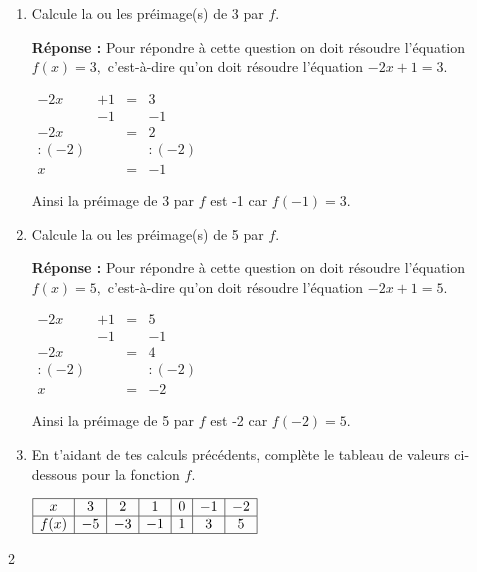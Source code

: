 \documentclass[a4paper,11pt]{report}
\begin{document}
{\begin{enumerate}
{\bf Réponse :} Pour répondre à cette question on doit résoudre l'équation $f(x)=1,$ c'est-à-dire qu'on doit résoudre l'équation $-2x+1=1.$
\begin{center}
$\begin{array}{cccc}
-2x&+1&=&1\\
&-1& & -1 \\\hline
-2x & & =& 0 \\
:(-2) & & & :(-2) \\\hline
x & & = &  0
\end{array}$
\end{center}
Ainsi la préimage de 1 par $f$ est 0 car $f(0)= 1.$
\item Calcule la ou les préimage(s) de 3 par $f$.

{\bf Réponse :} Pour répondre à cette question on doit résoudre l'équation $f(x)=3,$ c'est-à-dire qu'on doit résoudre l'équation $-2x+1=3.$
\begin{center}
$\begin{array}{cccc}
-2x&+1&=&3\\
&-1& & -1 \\\hline
-2x & & =& 2 \\
:(-2) & & & :(-2) \\\hline
x & & = &  -1
\end{array}$
\end{center}
Ainsi la préimage de 3 par $f$ est -1 car $f(-1)= 3.$
\item Calcule la ou les préimage(s) de 5 par $f$.

{\bf Réponse :} Pour répondre à cette question on doit résoudre l'équation $f(x)=5,$ c'est-à-dire qu'on doit résoudre l'équation $-2x+1=5.$
\begin{center}
$\begin{array}{cccc}
-2x&+1&=&5\\
&-1& & -1 \\\hline
-2x & & =& 4 \\
:(-2) & & & :(-2) \\\hline
x & & = &  -2
\end{array}$
\end{center}
Ainsi la préimage de 5 par $f$ est -2 car $f(-2)= 5.$
\item En t'aidant de tes calculs précédents, complète le tableau de valeurs ci-dessous pour la fonction $f.$
\begin{center}
$\begin{array}{|c|c|c|c|c|c|c|}\hline
x&3 &  2& 1& 0 & -1 & -2 \\\hline 
f(x)& -5&-3&-1&1&3&5 \\\hline
\end{array}$
\end{center}
\end{enumerate}
}{2}
\end{document}
